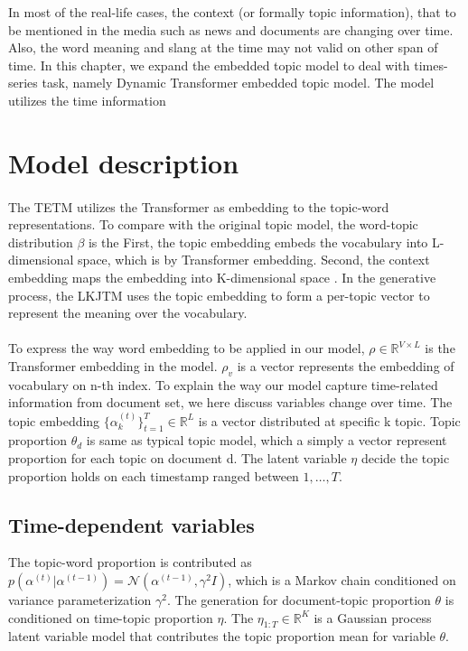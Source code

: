 In most of the real-life cases, the context (or formally topic information), that to be mentioned in the media such as news and documents are changing over time. Also, the word meaning and slang at the time may not valid on other span of time.
In this chapter, we expand the embedded topic model to deal with times-series task, namely Dynamic Transformer embedded topic model. The model utilizes the time information 
\section{Model description}
\paragraph{}The TETM utilizes the Transformer as embedding to the topic-word representations. To compare with the original topic model, the word-topic distribution $ \beta $ is the 
First, the topic embedding embeds the vocabulary into L-dimensional space, which is by Transformer embedding. Second, the context embedding maps the embedding into K-dimensional space . 
In the generative process, the LKJTM uses the topic embedding to form a per-topic vector to represent the meaning over the vocabulary. 
\paragraph{}
To express the way word embedding to be applied in our model, $ \rho\in\mathbb{R}^{V\times L} $ is the Transformer embedding in the model. $ \rho_v $ is a vector represents the embedding of vocabulary on n-th index.
To explain the way our model capture time-related information from document set, we here discuss variables change over time. The topic embedding $ \{\alpha^{(t)}_k\}^{T}_{t=1}\in\mathbb{R}^{L} $ is a vector distributed at specific k topic.
Topic proportion $ \theta_d $ is same as typical topic model, which a simply a vector represent proportion for each topic on document d.
The latent variable $ \eta $ decide the topic proportion holds on each timestamp ranged between $ 1, \dots, T $. 
\subsection{Time-dependent variables}
The topic-word proportion is contributed as $ p(\alpha^{(t)}|\alpha^{(t-1)})=\mathcal{N}(\alpha^{(t-1)},\gamma^2I) $, which is a Markov chain conditioned on variance parameterization $ \gamma^2 $.
The generation for document-topic proportion $ \theta $ is conditioned on time-topic proportion $ \eta $. The $ \eta_{1:T}\in\mathbb{R}^{K} $ is a Gaussian process latent variable model that contributes the topic proportion mean for variable $ \theta $. 
